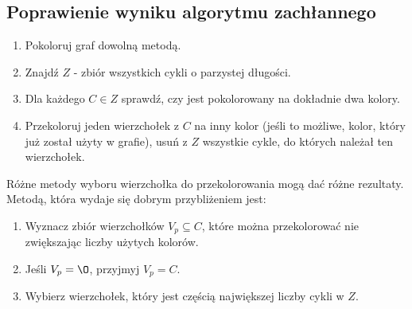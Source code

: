 \documentclass{article}
\begin{document}
\subsection{Poprawienie wyniku algorytmu zachłannego}
\begin{enumerate}
\item Pokoloruj graf dowolną metodą.
\item Znajdź $Z$ - zbiór wszystkich cykli o parzystej długości.
\item Dla każdego $C \in Z$ sprawdź, czy jest pokolorowany na dokładnie dwa kolory.
\item Przekoloruj jeden wierzchołek z $C$ na inny kolor (jeśli to możliwe, kolor, który już został użyty w grafie), usuń z $Z$ wszystkie cykle, do których należał ten wierzchołek.
\end{enumerate}
Różne metody wyboru wierzchołka do przekolorowania mogą dać różne rezultaty. Metodą, która wydaje się dobrym przybliżeniem jest:
\begin{enumerate}
\item Wyznacz zbiór wierzchołków $V_p \subseteq C$, które można przekolorować nie zwiększając liczby użytych kolorów.
\item Jeśli $V_p = \O$, przyjmyj $V_p = C$.
\item Wybierz wierzchołek, który jest częścią największej liczby cykli w $Z$. 
\end{enumerate}
\end{document}
